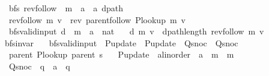 \begin{isabellebody}
\isanewline
{}\isamarkupfalse%
\ {\isacharparenleft}{\kern0pt}\ bfs{\isacharparenright}{\kern0pt}\ rev{\isacharunderscore}{\kern0pt}follow\ {\isacharcolon}{\kern0pt}{\isacharcolon}{\kern0pt}\ {\isachardoublequoteopen}{\isacharprime}{\kern0pt}m\ {\isasymRightarrow}\ {\isacharprime}{\kern0pt}a\ {\isasymRightarrow}\ {\isacharprime}{\kern0pt}a\ dpath{\isachardoublequoteclose}\ \isanewline
\ \ {\isachardoublequoteopen}rev{\isacharunderscore}{\kern0pt}follow\ m\ v\ {\isasymequiv}\ rev\ {\isacharparenleft}{\kern0pt}parent{\isachardot}{\kern0pt}follow\ {\isacharparenleft}{\kern0pt}P{\isacharunderscore}{\kern0pt}lookup\ m{\isacharparenright}{\kern0pt}\ v{\isacharparenright}{\kern0pt}{\isachardoublequoteclose}\isanewline
\isanewline
{}\isamarkupfalse%
\ {\isacharparenleft}{\kern0pt}\ bfs{\isacharunderscore}{\kern0pt}valid{\isacharunderscore}{\kern0pt}input{\isacharparenright}{\kern0pt}\ d\ {\isacharcolon}{\kern0pt}{\isacharcolon}{\kern0pt}\ {\isachardoublequoteopen}{\isacharprime}{\kern0pt}m\ {\isasymRightarrow}\ {\isacharprime}{\kern0pt}a\ {\isasymRightarrow}\ nat{\isachardoublequoteclose}\ \isanewline
\ \ {\isachardoublequoteopen}d\ m\ v\ {\isasymequiv}\ dpath{\isacharunderscore}{\kern0pt}length\ {\isacharparenleft}{\kern0pt}rev{\isacharunderscore}{\kern0pt}follow\ m\ v{\isacharparenright}{\kern0pt}{\isachardoublequoteclose}\isanewline
\isanewline
{}\isamarkupfalse%
\ bfs{\isacharunderscore}{\kern0pt}invar\ {\isacharequal}{\kern0pt}\isanewline
\ \ bfs{\isacharunderscore}{\kern0pt}valid{\isacharunderscore}{\kern0pt}input\ \ P{\isacharunderscore}{\kern0pt}update\ {\isacharequal}{\kern0pt}\ P{\isacharunderscore}{\kern0pt}update\ \ Q{\isacharunderscore}{\kern0pt}snoc\ {\isacharequal}{\kern0pt}\ Q{\isacharunderscore}{\kern0pt}snoc\ {\isacharplus}{\kern0pt}\isanewline
\ \ parent\ {\isachardoublequoteopen}P{\isacharunderscore}{\kern0pt}lookup\ {\isacharparenleft}{\kern0pt}parent\ s{\isacharparenright}{\kern0pt}{\isachardoublequoteclose}\ \isanewline
\ \ P{\isacharunderscore}{\kern0pt}update\ {\isacharcolon}{\kern0pt}{\isacharcolon}{\kern0pt}\ {\isachardoublequoteopen}{\isacharprime}{\kern0pt}a{\isacharcolon}{\kern0pt}{\isacharcolon}{\kern0pt}linorder\ {\isasymRightarrow}\ {\isacharprime}{\kern0pt}a\ {\isasymRightarrow}\ {\isacharprime}{\kern0pt}m\ {\isasymRightarrow}\ {\isacharprime}{\kern0pt}m{\isachardoublequoteclose}\ \isanewline
\ \ Q{\isacharunderscore}{\kern0pt}snoc\ {\isacharcolon}{\kern0pt}{\isacharcolon}{\kern0pt}\ {\isachardoublequoteopen}{\isacharprime}{\kern0pt}q\ {\isasymRightarrow}\ {\isacharprime}{\kern0pt}a\ {\isasymRightarrow}\ {\isacharprime}{\kern0pt}q{\isachardoublequoteclose}\ \isanewline

\end{isabellebody}
